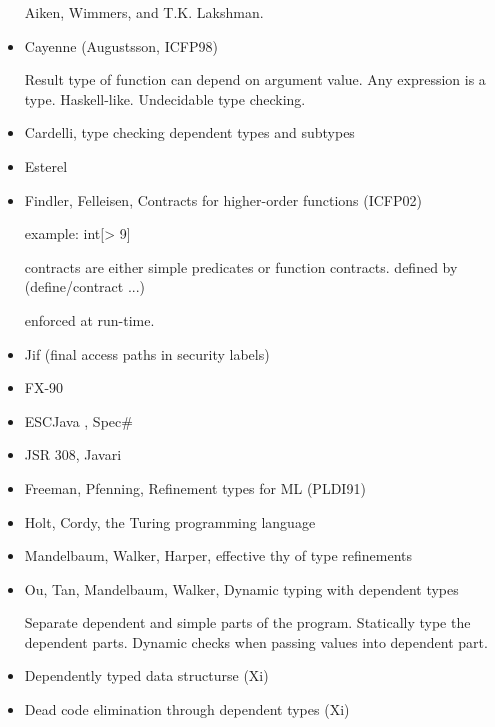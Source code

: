 \begin{itemize}
Aiken, Wimmers, and T.K. Lakshman.

\item Cayenne (Augustsson, ICFP98)

Result type of function can depend on argument value.
Any expression is a type.
Haskell-like.
Undecidable type checking.

\item Cardelli, type checking dependent types and subtypes

\item Esterel

\item Findler, Felleisen, Contracts for higher-order functions (ICFP02)

example: int[> 9]

contracts are either simple predicates or function contracts.
defined by (define/contract ...)

enforced at run-time.

\item Jif (final access paths in security labels)
\item FX-90
\item ESCJava \cite{esc-java}, Spec\#
\item JSR 308, Javari
\item Freeman, Pfenning, Refinement types for ML (PLDI91)
\item Holt, Cordy, the Turing programming language
\item Mandelbaum, Walker, Harper, effective thy of type refinements
\item Ou, Tan, Mandelbaum, Walker, Dynamic typing with dependent types

Separate dependent and simple parts of the program.
Statically type the dependent parts.
Dynamic checks when passing values into dependent part.

\item Dependently typed data structurse (Xi)
\item Dead code elimination through dependent types (Xi)
\end{itemize}
